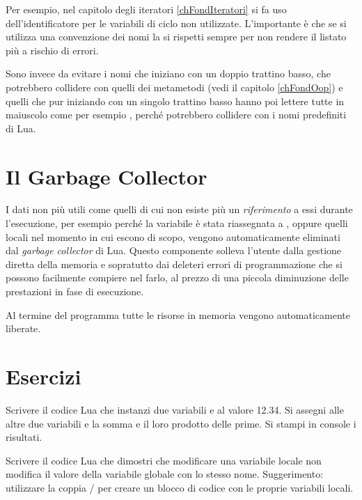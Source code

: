 Per esempio, nel capitolo degli iteratori \ref{chFondIteratori} si fa uso
dell'identificatore \key{\_} per le variabili di ciclo non utilizzate.
L'importante è che se si utilizza una convenzione dei nomi la si rispetti sempre
per non rendere il listato più a rischio di errori.

Sono invece da evitare i nomi che iniziano con un doppio trattino basso, che
potrebbero collidere con quelli dei metametodi (vedi il capitolo
\ref{chFondOop}) e quelli che pur iniziando con un singolo trattino basso hanno
poi lettere tutte in maiuscolo come per esempio ,
perché potrebbero collidere con i nomi predefiniti di Lua.


\section{Il Garbage Collector}

I dati non più utili come quelli di cui non esiste più un \emph{riferimento} a
essi durante l'esecuzione, per esempio perché la variabile è stata riassegnata a
, oppure quelli locali nel momento in cui escono di scopo, vengono
automaticamente eliminati dal \emph{garbage collector} di Lua. Questo componente
solleva l'utente dalla gestione diretta della memoria e sopratutto dai deleteri
errori di programmazione che si possono facilmente compiere nel farlo, al prezzo
di una piccola diminuzione delle prestazioni in fase di esecuzione.

Al termine del programma tutte le risorse in memoria vengono automaticamente
liberate.

\section{Esercizi}

\begin{Exercise}[label=fond-01]
Scrivere il codice Lua che instanzi due variabili  e  al valore
12.34. Si assegni alle altre due variabili  e  la somma e il
loro prodotto delle prime. Si stampi in console i risultati.
\end{Exercise}

\begin{Exercise}[label=fond-02]
Scrivere il codice Lua che dimostri che modificare una variabile locale non
modifica il valore della variabile globale con lo stesso nome. Suggerimento:
utilizzare la coppia / per creare un blocco di codice con le
proprie variabili locali.
\end{Exercise}

